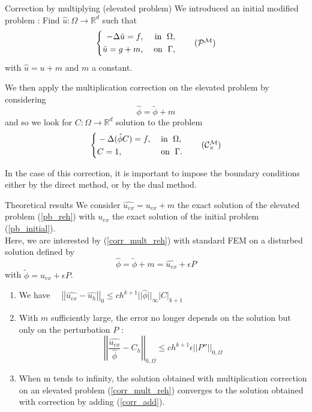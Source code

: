 \documentclass[compress,10pt,xcolor={table,dvipsnames},t]{beamer}
\begin{document}
	\begin{frame}{Correction by multiplying (elevated problem)}
		We introduced an initial modified problem : Find $\hat{u} : \Omega \rightarrow \mathbb{R}^d$ such that
		\begin{equation}
			\left\{
			\begin{aligned}
				-\Delta \hat{u} = f, \; &&\text{in } \; \Omega, \\
				\hat{u}=g+m, \; &&\text{on } \; \Gamma,
			\end{aligned}
			\right. \tag{$\mathcal{P}^\mathcal{M}$} \label{pb_reh}
		\end{equation}
		with $\hat{u}=u+m$ and $m$ a constant.
		
		We then apply the multiplication correction on the elevated problem by considering
		\begin{equation*}
			\hat{\phi}=\tilde{\phi}+m
		\end{equation*}
		and so we look for $C: \Omega \rightarrow \mathbb{R}^d$ solution to the problem
		\begin{equation*}
			\left\{\begin{aligned}
				&-\Delta (\hat{\phi}C)=f, \; &&\text{in } \; \Omega, \\
				&C=1, \; &&\text{on } \; \Gamma.
			\end{aligned}\right. \tag{$\mathcal{C}_\times^\mathcal{M}$} \label{corr_mult_reh}
		\end{equation*}
		
		In the case of this correction, it is important to impose the boundary conditions either by the direct method, or by the dual method.
	\end{frame}
	
	\begin{frame}{Theoretical results}
		We consider $\hat{u_{ex}}=u_{ex}+m$ the exact solution of the elevated problem (\ref{pb_reh}) with $u_{ex}$ the exact solution of the initial problem (\ref{pb_initial}). \\
		Here, we are interested by (\ref{corr_mult_reh}) with standard FEM on a disturbed solution defined by
		$$\hat{\phi}=\tilde{\phi}+m=\hat{u_{ex}}+\epsilon P$$
		with $\tilde{\phi}=u_{ex}+\epsilon P$.
		\begin{enumerate}[\ding{217}]
			\item We have $\quad \left|\left|\hat{u_{ex}}-\hat{u_h}\right|\right|_0\le ch^{k+1}||\hat{\phi}||_\infty\left|C\right|_{k+1}$
			\item With $m$ sufficiently large, the error no longer depends on the solution but only on the perturbation $P$ :
			\begin{equation*}
				\left|\left|\frac{\hat{u_{ex}}}{\hat{\phi}}-C_h\right|\right|_{0,\Omega}\le ch^{k+1}\epsilon\left|\left|P''\right|\right|_{0,\Omega}
			\end{equation*}
			\item When m tends to infinity, the solution obtained with multiplication correction on an elevated problem  (\ref{corr_mult_reh}) converges to the solution obtained with correction by adding (\ref{corr_add}).
		\end{enumerate}
	\end{frame}
	
\end{document}
